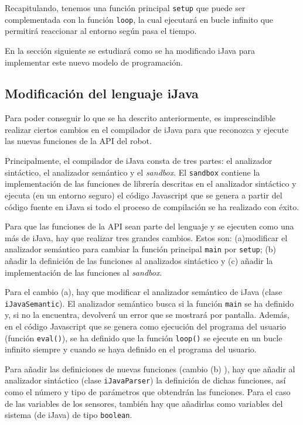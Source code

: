 Recapitulando, tenemos una función principal \texttt{setup} que puede ser complementada con la función \texttt{loop}, la cual ejecutará en bucle infinito que permitirá reaccionar al entorno según pasa el tiempo.

En la sección siguiente se estudiará como se ha modificado iJava para implementar este nuevo modelo de programación.

\subsection{Modificación del lenguaje iJava}
\label{sec:modificacion-ijava}

Para poder conseguir lo que se ha descrito anteriormente, es imprescindible realizar ciertos cambios en el compilador de iJava para que reconozca y ejecute las nuevas funciones de la API del robot.

Principalmente, el compilador de iJava consta de tres partes: el analizador sintáctico, el analizador semántico y el \emph{sandbox}. El \texttt{sandbox} contiene la implementación de las funciones de librería descritas en el analizador sintáctico y ejecuta (en un entorno seguro) el código Javascript que se genera a partir del código fuente en iJava si todo el proceso de compilación se ha realizado con éxito. 

Para que las funciones de la API sean parte del lenguaje y se ejecuten como una más de iJava, hay que realizar tres grandes cambios. Estos son: (a)modificar el analizador semántico para cambiar la función principal \texttt{main} por \texttt{setup}; (b) añadir la definición de las funciones al analizados sintáctico y (c) añadir la implementación de las funciones al \emph{sandbox}.

Para el cambio (a), hay que modificar el analizador semántico de iJava (clase \texttt{iJavaSemantic}). El analizador semántico busca si la función \texttt{main} se ha definido y, si no la encuentra, devolverá un error que se mostrará por pantalla. Además, en el código Javascript que se genera como ejecución del programa del usuario (función \texttt{eval()}), se ha definido que la función \texttt{loop()} se ejecute en un bucle infinito siempre y cuando se haya definido en el programa del usuario.

Para añadir las definiciones de nuevas funciones (cambio (b) ), hay que añadir al analizador sintáctico (clase \texttt{iJavaParser}) la definición de dichas funciones, así como el número y tipo de parámetros que obtendrán las funciones. Para el caso de las variables de los sensores, también hay que añadirlas como variables del sistema (de iJava) de tipo \texttt{boolean}.


